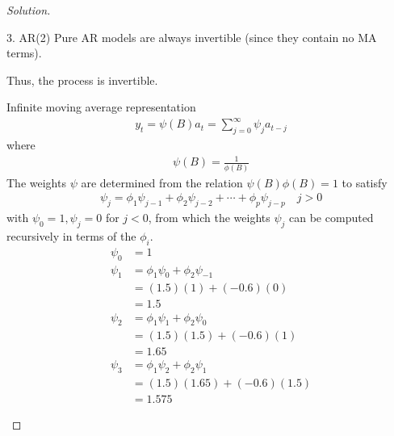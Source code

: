 \documentclass[UTF8,a4paper,14pt]{ctexart}
\newenvironment{solution}
  {\renewcommand\qedsymbol{$\blacksquare$}\begin{proof}[Solution]}
  {\end{proof}}
\theoremstyle{definition}
\theoremstyle{remark}
\begin{document}
\begin{solution}
\begin{mybox}{3. AR(2)}
    Pure AR models are always invertible (since they contain no MA terms).

    Thus, the process is invertible.



    Infinite moving average representation
    \begin{equation}\
      \begin{aligned}
      y_t = \psi(B)a_t =\sum_{j = 0}^{\infty} \psi_j a_{t-j} 
      \end{aligned}
    \end{equation}
    where
      \begin{equation}\
        \begin{aligned}
        \psi(B) = \frac{1}{\phi(B)}
        \end{aligned}
      \end{equation}
      The weights \(\psi\) are determined from the relation \(\psi(B) \phi(B)= 1\) to satisfy
      \begin{equation}\
        \begin{aligned}
        \psi_j = \phi_1\psi_{j-1}+\phi_2\psi_{j-2}+\cdots+\phi_p\psi_{j-p}\quad j>0
        \end{aligned}
      \end{equation}
      with \(\psi_0 = 1, \psi_j = 0\) for \(j<0\), from which the weights \(\psi_j\) can be computed recursively in terms of the \(\phi_i\).
      \begin{equation}\
        \begin{aligned}
        \psi_0 &= 1\\
        \psi_1 &= \phi_1\psi_0+\phi_2\psi_{-1}\\
        &=(1.5)(1)+(-0.6)(0)\\
        &=1.5\\
        \psi_2 &= \phi_1\psi_1+\phi_2\psi_{0}\\
        &=(1.5)(1.5)+(-0.6)(1)\\
        &=1.65\\
        \psi_3 &= \phi_1\psi_2+\phi_2\psi_{1}\\
        &=(1.5)(1.65)+(-0.6)(1.5)\\
        &=1.575
      \end{aligned}
      \end{equation}



\end{mybox}
\end{solution}
\end{document}
